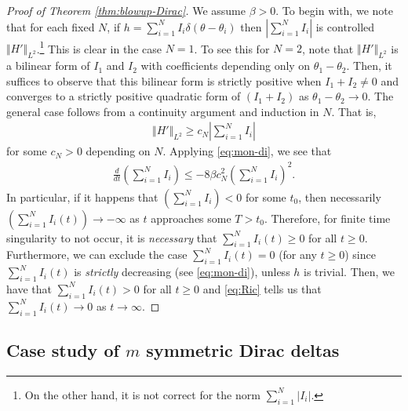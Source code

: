 \documentclass[10pt]{article}
\theoremstyle{definition}
\theoremstyle{remark}
\numberwithin{equation}{section}
\newcommand{\nrm}[1]{\Vert#1\Vert}
\newcommand{\0}{\emptyset}
\newcommand{\bt}{\beta}
\newcommand{\dlt}{\delta}
\newcommand{\tht}{\theta}
\begin{document}
    \begin{proof}[Proof of Theorem \ref{thm:blowup-Dirac}]
        
	We assume $\bt>0$. To begin with, we note that for each fixed $N$, if $h = \sum_{i=1}^{N} I_i\dlt(\tht-\tht_i)$ then $|\sum_{i=1}^{N} I_i|$ is controlled $\nrm{H'}_{L^{2}}$.\footnote{On the other hand, it is not correct for the norm $\sum_{i=1}^{N} |I_i|$.} This is clear in the case $N=1$. To see this for $N=2$, note that $\nrm{H'}_{L^2}$ is a bilinear form of $I_1$ and $I_2$ with coefficients depending only on $\tht_1-\tht_2$. Then, it suffices to observe that this bilinear form is strictly positive when $I_1+I_2 \ne 0$ and converges to a strictly positive quadratic form of $(I_1+I_2)$ as $\tht_1-\tht_2 \to 0$. The general case follows from a continuity argument and induction in $N$. That is, \begin{equation*}
		\begin{split}
			\nrm{H'}_{L^2} \ge c_N|\sum_{i=1}^{N} I_i|
		\end{split}
	\end{equation*} for some $c_N>0$ depending on $N$. Applying \eqref{eq:mon-di}, we see that \begin{equation}\label{eq:Ric}
		\begin{split}
			\frac{d}{dt} ( \sum_{i=1}^{N} I_i ) \le -8\bt c_{N}^{2} ( \sum_{i=1}^{N} I_i )^{2}. 
		\end{split}
	\end{equation} In particular, if it happens that $( \sum_{i=1}^{N} I_i ) < 0$ for some $t_0$, then necessarily $( \sum_{i=1}^{N} I_i(t) ) \to -\infty$ as $t$ approaches some $T>t_0$. Therefore, for finite time singularity to not occur, it is \textit{necessary} that $\sum_{i=1}^{N} I_i(t) \ge 0$ for all $t\ge0$. Furthermore, we can exclude the case $\sum_{i=1}^{N} I_i(t) = 0$ (for any $t\ge0$) since $\sum_{i=1}^{N} I_i(t)$ is \textit{strictly} decreasing (see \eqref{eq:mon-di}), unless $h$ is trivial. Then, we have that  $\sum_{i=1}^{N} I_i(t) > 0$ for all $t\ge0$ and \eqref{eq:Ric} tells us that  $\sum_{i=1}^{N} I_i(t) \to 0$ as $t\to\infty$.\end{proof}
    
	\subsection{Case study of $m$ symmetric Dirac deltas}\label{subsec:case-study}
	
\end{document}
